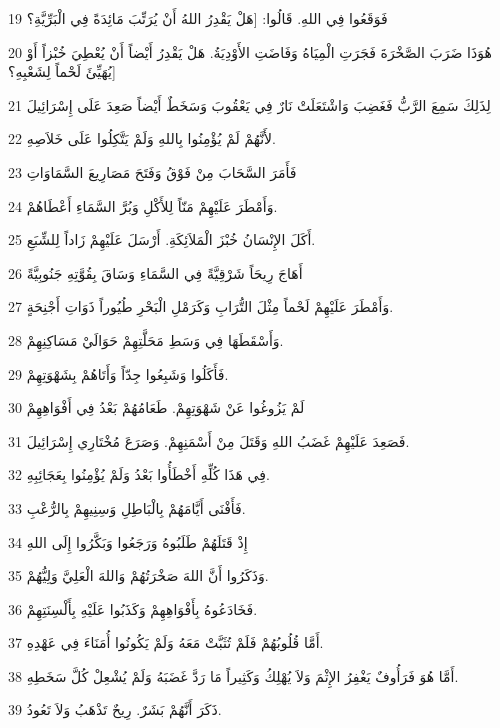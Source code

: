 \par 19 فَوَقَعُوا فِي اللهِ. قَالُوا: [هَلْ يَقْدِرُ اللهُ أَنْ يُرَتِّبَ مَائِدَةً فِي الْبَرِّيَّةِ؟
\par 20 هُوَذَا ضَرَبَ الصَّخْرَةَ فَجَرَتِ الْمِيَاهُ وَفَاضَتِ الأَوْدِيَةُ. هَلْ يَقْدِرُ أَيْضاً أَنْ يُعْطِيَ خُبْزاً أَوْ يُهَيِّئَ لَحْماً لِشَعْبِهِ؟]
\par 21 لِذَلِكَ سَمِعَ الرَّبُّ فَغَضِبَ وَاشْتَعَلَتْ نَارٌ فِي يَعْقُوبَ وَسَخَطٌ أَيْضاً صَعِدَ عَلَى إِسْرَائِيلَ
\par 22 لأَنَّهُمْ لَمْ يُؤْمِنُوا بِاللهِ وَلَمْ يَتَّكِلُوا عَلَى خَلاَصِهِ.
\par 23 فَأَمَرَ السَّحَابَ مِنْ فَوْقُ وَفَتَحَ مَصَارِيعَ السَّمَاوَاتِ
\par 24 وَأَمْطَرَ عَلَيْهِمْ مَنّاً لِلأَكْلِ وَبُرَّ السَّمَاءِ أَعْطَاهُمْ.
\par 25 أَكَلَ الإِنْسَانُ خُبْزَ الْمَلاَئِكَةِ. أَرْسَلَ عَلَيْهِمْ زَاداً لِلشِّبَعِ.
\par 26 أَهَاجَ رِيحَاً شَرْقِيَّةً فِي السَّمَاءِ وَسَاقَ بِقُوَّتِهِ جَنُوبِيَّةً
\par 27 وَأَمْطَرَ عَلَيْهِمْ لَحْماً مِثْلَ التُّرَابِ وَكَرَمْلِ الْبَحْرِ طُيُوراً ذَوَاتِ أَجْنِحَةٍ.
\par 28 وَأَسْقَطَهَا فِي وَسَطِ مَحَلَّتِهِمْ حَوَالَيْ مَسَاكِنِهِمْ.
\par 29 فَأَكَلُوا وَشَبِعُوا جِدّاً وَأَتَاهُمْ بِشَهْوَتِهِمْ.
\par 30 لَمْ يَزُوغُوا عَنْ شَهْوَتِهِمْ. طَعَامُهُمْ بَعْدُ فِي أَفْوَاهِهِمْ
\par 31 فَصَعِدَ عَلَيْهِمْ غَضَبُ اللهِ وَقَتَلَ مِنْ أَسْمَنِهِمْ. وَصَرَعَ مُخْتَارِي إِسْرَائِيلَ.
\par 32 فِي هَذَا كُلِّهِ أَخْطَأُوا بَعْدُ وَلَمْ يُؤْمِنُوا بِعَجَائِبِهِ.
\par 33 فَأَفْنَى أَيَّامَهُمْ بِالْبَاطِلِ وَسِنِيهِمْ بِالرُّعْبِ.
\par 34 إِذْ قَتَلَهُمْ طَلَبُوهُ وَرَجَعُوا وَبَكَّرُوا إِلَى اللهِ
\par 35 وَذَكَرُوا أَنَّ اللهَ صَخْرَتُهُمْ وَاللهَ الْعَلِيَّ وَلِيُّهُمْ.
\par 36 فَخَادَعُوهُ بِأَفْوَاهِهِمْ وَكَذَبُوا عَلَيْهِ بِأَلْسِنَتِهِمْ.
\par 37 أَمَّا قُلُوبُهُمْ فَلَمْ تُثَبَّتْ مَعَهُ وَلَمْ يَكُونُوا أُمَنَاءَ فِي عَهْدِهِ.
\par 38 أَمَّا هُوَ فَرَأُوفٌ يَغْفِرُ الإِثْمَ وَلاَ يُهْلِكُ وَكَثِيراً مَا رَدَّ غَضَبَهُ وَلَمْ يُشْعِلْ كُلَّ سَخَطِهِ.
\par 39 ذَكَرَ أَنَّهُمْ بَشَرٌ. رِيحٌ تَذْهَبُ وَلاَ تَعُودُ.
